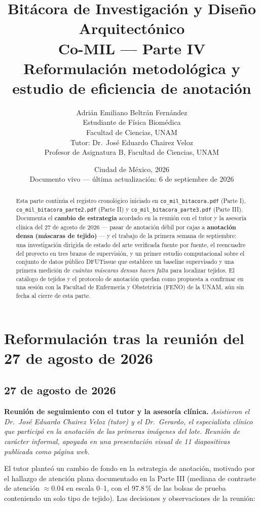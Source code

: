 \documentclass[12pt,letterpaper]{report}
\title{\textbf{Bitácora de Investigación y Diseño Arquitectónico \\ Co-MIL --- Parte IV \\[0.3em]
\large Reformulación metodológica y estudio de eficiencia de anotación}}
\author{Adrián Emiliano Beltrán Fernández \\ \small Estudiante de Física Biomédica \\ \small Facultad de Ciencias, UNAM \\[1em]
\small Tutor: Dr.\ José Eduardo Chairez Veloz \\ \small Profesor de Asignatura B, Facultad de Ciencias, UNAM}
\date{Ciudad de México, 2026 \\ \small Documento vivo --- última actualización: 6 de septiembre de 2026}
\newcommand{\entrada}[2]{%
    \vspace{0.6em}
    \noindent\textbf{#1.} \textit{#2}
    \vspace{0.3em}
    \par
}
\begin{document}
\maketitle

\begin{abstract}
\noindent Esta parte continúa el registro cronológico iniciado en \texttt{co\_mil\_bitacora.pdf}
(Parte I), \texttt{co\_mil\_bitacora\_parte2.pdf} (Parte II) y \texttt{co\_mil\_bitacora\_parte3.pdf}
(Parte III). Documenta el \textbf{cambio de estrategia} acordado en la reunión con el tutor y la
asesoría clínica del 27 de agosto de 2026 --- pasar de anotación débil por cajas a \textbf{anotación
densa (máscaras de tejido)} --- y el trabajo de la primera semana de septiembre: una investigación
dirigida de estado del arte verificada fuente por fuente, el reencuadre del proyecto en tres brazos
de supervisión, y un primer estudio computacional sobre el conjunto de datos público DFUTissue que
establece un baseline supervisado y una primera medición de \emph{cuántas máscaras densas hacen
falta} para localizar tejidos. El catálogo de tejidos y el protocolo de anotación quedan como
propuesta a confirmar en una sesión con la Facultad de Enfermería y Obstetricia (FENO) de la UNAM,
aún sin fecha al cierre de esta parte.
\end{abstract}

\tableofcontents

\chapter{Reformulación tras la reunión del 27 de agosto de 2026}

\section{27 de agosto de 2026}

\entrada{Reunión de seguimiento con el tutor y la asesoría clínica}{Asistieron el Dr.\ José Eduardo
Chairez Veloz (tutor) y el Dr.\ Gerardo, el especialista clínico que participó en la anotación de las
primeras imágenes del lote. Reunión de carácter informal, apoyada en una presentación visual de 11
diapositivas publicada como página web.}

El tutor planteó un cambio de fondo en la estrategia de anotación, motivado por el hallazgo de
atención plana documentado en la Parte III (mediana de contraste de atención $\approx 0.04$ en escala
0--1, con el 97.8\,\% de las bolsas de prueba conteniendo un solo tipo de tejido). Las decisiones y
observaciones de la reunión:
\end{document}
